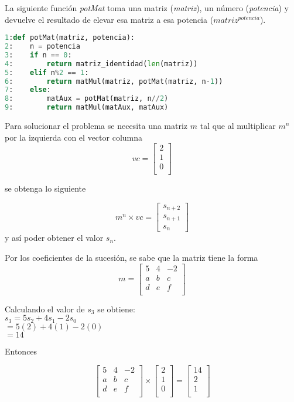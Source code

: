 \documentclass{article}
\begin{document}
La siguiente función \textit{potMat} toma una matriz (\textit{matriz}), un número (\textit{potencia}) y devuelve el resultado de elevar esa matriz a esa potencia ($matriz^{potencia}$).

\begin{lstlisting}[language=Python]
1:def potMat(matriz, potencia):
2:    n = potencia
3:    if n == 0:
4:        return matriz_identidad(len(matriz))
5:    elif n%2 == 1:
6:        return matMul(matriz, potMat(matriz, n-1))
7:    else:
8:        matAux = potMat(matriz, n//2)
9:        return matMul(matAux, matAux)
\end{lstlisting}

Para solucionar el problema se necesita una matriz $m$ tal que al multiplicar $m^n$ por la izquierda con el vector columna
\[vc = \begin{bmatrix}
2 \\
1 \\
0 \\
\end{bmatrix}\]

se obtenga lo siguiente

\[
m^{n} \times vc =
\begin{bmatrix}
s_{n+2} \\
s_{n+1} \\
s_n
\end{bmatrix}
\] y así poder obtener el valor $s_n$.

Por los coeficientes de la sucesión, se sabe que la matriz tiene la forma
\[
m =
\begin{bmatrix}
5 & 4 & -2 \\
a & b & c \\
d & e & f\\
\end{bmatrix}
\]

Calculando el valor de $s_3$ se obtiene:\\
$s_3 = 5s_2 + 4s_1 - 2s_0$\\
$ = 5(2) + 4(1) - 2(0)$\\
$ = 14$

Entonces

\[
\begin{bmatrix}
5 & 4 & -2 \\
a & b & c \\
d & e & f\\
\end{bmatrix}
\times
\begin{bmatrix}
2 \\
1 \\
0 \\
\end{bmatrix}
=
\begin{bmatrix}
14 \\
2 \\
1 \\
\end{bmatrix}
\]
\end{document}
